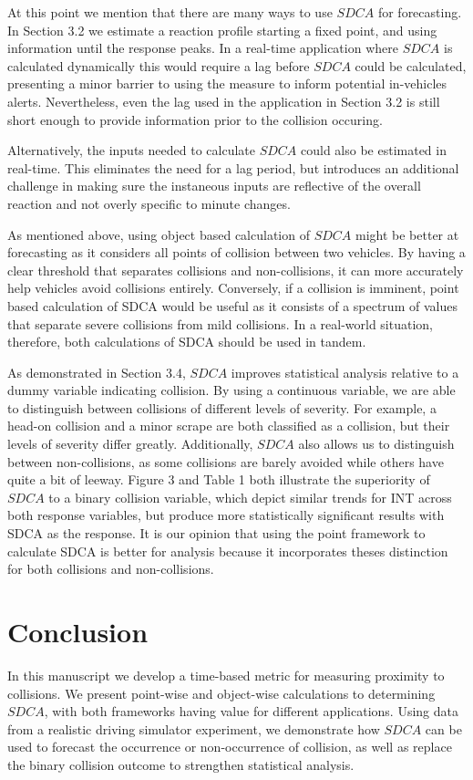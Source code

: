 \documentclass{article}
\begin{document}
At this point we mention that there are many ways to use $SDCA$ for forecasting.  In Section 3.2 we estimate a reaction profile starting a fixed point, and using information until the response peaks.  In a real-time application where $SDCA$ is calculated dynamically this would require a lag before $SDCA$ could be calculated, presenting a minor barrier to using the measure to inform potential in-vehicles alerts.  Nevertheless, even the lag used in the application in Section 3.2 is still short enough to provide information prior to the collision occuring.  

Alternatively, the inputs needed to calculate $SDCA$ could also be estimated in real-time. This eliminates the need for a lag period, but introduces an additional challenge in making sure the instaneous inputs are reflective of the overall reaction and not overly specific to minute changes.

As mentioned above, using object based calculation of $SDCA$ might be better at forecasting as it considers all points of collision between two vehicles. By having a clear threshold that separates collisions and non-collisions, it can more accurately help vehicles avoid collisions entirely. Conversely, if a collision is imminent, point based calculation of SDCA would be useful as it consists of a spectrum of values that separate severe collisions from mild collisions. In a real-world situation, therefore, both calculations of SDCA should be used in tandem.

As demonstrated in Section 3.4, $SDCA$ improves statistical analysis relative to a dummy variable indicating collision. By using a continuous variable, we are able to distinguish between collisions of different levels of severity. For example, a head-on collision and a minor scrape are both classified as a collision, but their levels of severity differ greatly. Additionally, $SDCA$ also allows us to distinguish between non-collisions, as some collisions are barely avoided while others have quite a bit of leeway.  Figure 3 and Table 1 both illustrate the superiority of $SDCA$ to a binary collision variable, which depict similar trends for INT across both response variables, but produce more statistically significant results with SDCA as the response. It is our opinion that using the point framework to calculate SDCA is better for analysis because it incorporates theses distinction for both collisions and non-collisions.

\section{Conclusion}

In this manuscript we develop a time-based metric for measuring proximity to collisions. We present point-wise and object-wise calculations to determining $SDCA$, with both frameworks having value for different applications. Using data from a realistic driving simulator experiment, we demonstrate how $SDCA$ can be used to forecast the occurrence or non-occurrence of collision, as well as replace the binary collision outcome to strengthen statistical analysis.


 
\end{document}
